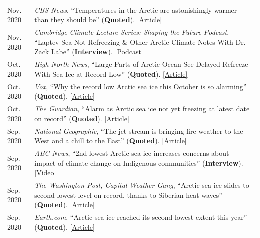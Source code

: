\documentclass[margin,line,palatino,courier,10pt]{res}
\begin{document}
\begin{resume}
\begin{tabular}{@{}p{0.9in}p{4in}}
\end{tabular}
\begin{tabular}{@{}p{0.9in}p{4in}}
Nov. 2020 & \textit{CBS News}, ``Temperatures in the Arctic are astonishingly warmer than they should be'' (\textbf{Quoted}). \href{https://www.cbsnews.com/news/climate-change-arctic-temperatures-warmer/}{[Article]}\\
Nov. 2020 & \textit{Cambridge Climate Lecture Series: Shaping the Future Podcast}, ``Laptev Sea Not Refreezing \& Other Arctic Climate Notes With Dr. Zack Labe'' (\textbf{Interview}). \href{https://climateseries.com/climate-change-podcast/74-dr-zack-labe-arctic-laptev-sea}{[Podcast]}\\
Oct. 2020 & \textit{High North News}, ``Large Parts of Arctic Ocean See Delayed Refreeze With Sea Ice at Record Low'' (\textbf{Quoted}). \href{https://www.highnorthnews.com/en/large-parts-arctic-ocean-see-delayed-refreeze-sea-ice-record-low}{[Article]}\\
Oct. 2020 & \textit{Vox}, ``Why the record low Arctic sea ice this October is so alarming'' (\textbf{Quoted}). \href{https://www.vox.com/21536859/arctic-sea-ice-2020-climate-change-alaska-polar-bears-charts}{[Article]}\\
Oct. 2020 & \textit{The Guardian}, ``Alarm as Arctic sea ice not yet freezing at latest date on record'' (\textbf{Quoted}). \href{https://www.theguardian.com/world/2020/oct/22/alarm-as-arctic-sea-ice-not-yet-freezing-at-latest-date-on-record}{[Article]}\\
Sep. 2020 & \textit{National Geographic}, ``The jet stream is bringing fire weather to the West and a chill to the East'' (\textbf{Quoted}). \href{https://www.nationalgeographic.com/science/2020/09/jet-stream-fire-weather-california-chill-eastern-us/}{[Article]}\\
Sep. 2020 & \textit{ABC News}, ``2nd-lowest Arctic sea ice increases concerns about impact of climate change on Indigenous communities'' (\textbf{Interview}). \href{https://abcnews.go.com/International/2nd-lowest-arctic-sea-ice-increases-concerns-impact/story?id=73224755}{[Video]}\\
Sep. 2020 & \textit{The Washington Post, Capital Weather Gang}, ``Arctic sea ice slides to second-lowest level on record, thanks to Siberian heat waves'' (\textbf{Quoted}). \href{https://www.washingtonpost.com/weather/2020/09/22/arctic-sea-ice-low/}{[Article]}\\
Sep. 2020 & \textit{Earth.com}, ``Arctic sea ice reached its second lowest extent this year'' (\textbf{Quoted}). \href{https://www.earth.com/news/arctic-sea-ice-reached-its-second-lowest-extent-this-year/}{[Article]}\\

\end{tabular}
\end{resume}
\end{document}
